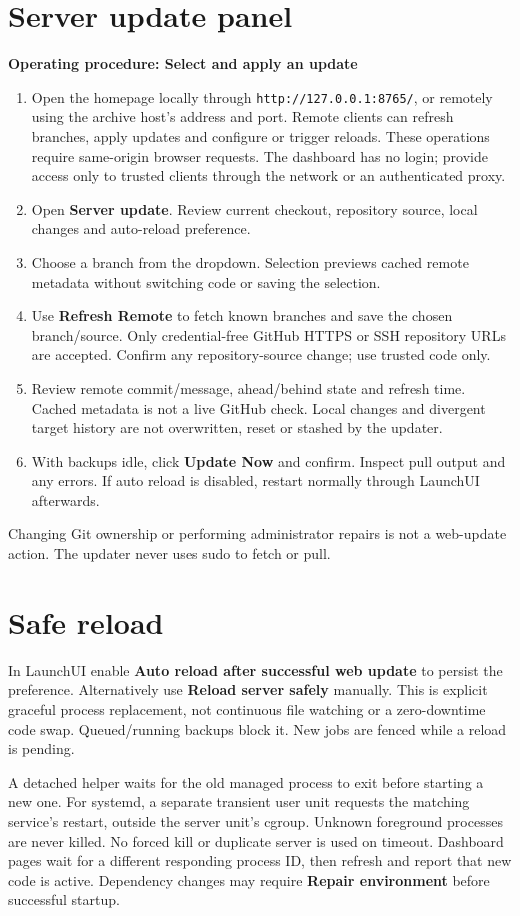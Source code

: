 \documentclass[11pt,oneside,openany]{book}
\newcommand{\pathcode}[1]{\nolinkurl{#1}}
\newcommand{\ui}[1]{\textbf{#1}}
\newenvironment{procedure}[1]{\par\medskip\noindent\textbf{Operating procedure: #1}\par\smallskip\begin{enumerate}}{\end{enumerate}\medskip}
\begin{document}
\section{Server update panel}
\begin{procedure}{Select and apply an update}
\item Open the homepage locally through \pathcode{http://127.0.0.1:8765/},
or remotely using the archive host's address and port.
Remote clients can refresh branches, apply updates and configure or trigger reloads.
These operations require same-origin browser requests. The dashboard has no login;
provide access only to trusted clients through the network or an authenticated proxy.
\item Open \ui{Server update}. Review current checkout, repository source, local
changes and auto-reload preference.
\item Choose a branch from the dropdown. Selection previews cached remote metadata
without switching code or saving the selection.
\item Use \ui{Refresh Remote} to fetch known branches and save the chosen branch/source.
Only credential-free GitHub HTTPS or SSH repository URLs are accepted. Confirm any
repository-source change; use trusted code only.
\item Review remote commit/message, ahead/behind state and refresh time. Cached
metadata is not a live GitHub check. Local changes and divergent target history are
not overwritten, reset or stashed by the updater.
\item With backups idle, click \ui{Update Now} and confirm. Inspect pull output and
any errors. If auto reload is disabled, restart normally through LaunchUI afterwards.
\end{procedure}
Changing Git ownership or performing administrator repairs is not a web-update action.
The updater never uses sudo to fetch or pull.

\section{Safe reload}
In LaunchUI enable \ui{Auto reload after successful web update} to persist the
preference. Alternatively use \ui{Reload server safely} manually. This is explicit
graceful process replacement, not continuous file watching or a zero-downtime code swap.
Queued/running backups block it. New jobs are fenced while a reload is pending.

A detached helper waits for the old managed process to exit before starting a new
one. For systemd, a separate transient user unit requests the matching service's
restart, outside the server unit's cgroup. Unknown foreground processes are never
killed. No forced kill or duplicate server is used on timeout. Dashboard pages wait
for a different responding process ID, then refresh and report that new code is active.
Dependency changes may require \ui{Repair environment} before successful startup.
\end{document}
